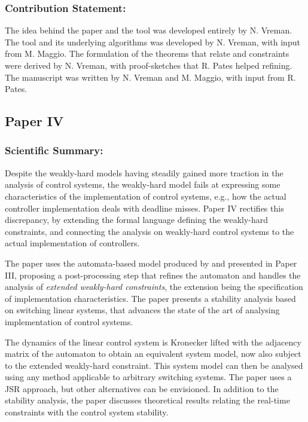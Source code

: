 \subsubsection*{Contribution Statement:}%
%
The idea behind the paper and the tool was developed entirely by N. Vreman. 
The tool and its underlying algorithms was developed by N. Vreman, with input from M. Maggio.
The formulation of the theorems that relate \tAH{} and \tRH{} constraints were derived by N. Vreman, with proof-sketches that R. Pates helped refining.
The manuscript was written by N. Vreman and M. Maggio, with input from R. Pates.


\subsection*{Paper IV}%
%
\begin{quote}
\end{quote}

\subsubsection*{Scientific Summary:}%
%
Despite the weakly-hard models having steadily gained more traction in the analysis of control systems, the weakly-hard model fails at expressing some characteristics of the implementation of control systems, e.g., how the actual controller implementation deals with deadline misses.
Paper IV rectifies this discrepancy, by extending the formal language defining the weakly-hard constraints, and connecting the analysis on weakly-hard control systems to the actual implementation of controllers.

The paper uses the automata-based model produced by \tool{} and presented in Paper III, proposing a post-processing step that refines the automaton and handles the analysis of \emph{extended weakly-hard constraints}, the extension being the specification of implementation characteristics.
The paper presents a stability analysis based on switching linear systems, that advances the state of the art of analysing implementation of control systems.

The dynamics of the linear control system is Kronecker lifted with the adjacency matrix of the automaton to obtain an equivalent system model, now also subject to the extended weakly-hard constraint.
This system model can then be analysed using any method applicable to arbitrary switching systems.
The paper uses a JSR approach, but other alternatives can be envisioned.
In addition to the stability analysis, the paper discusses theoretical results relating the real-time constraints with the control system stability.

